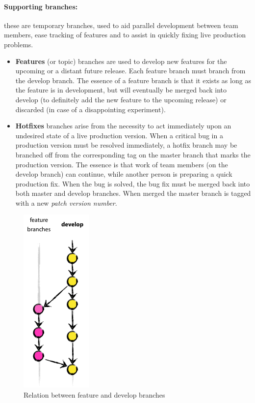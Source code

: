 \documentclass[12pt,a4paper]{article}
\begin{document}
\paragraph{Supporting branches:} these are temporary branches, used to aid parallel development between team members, ease tracking of features and to assist in quickly fixing live production problems.
\begin{itemize}
\item \textbf{Features} (or topic) branches are  used to develop new features for the upcoming or a distant future release. Each feature branch must branch from the develop branch. The essence of a feature branch is that it exists as long as the feature is in development, but will eventually be merged back into develop (to definitely add the new feature to the upcoming release) or discarded (in case of a disappointing experiment).
\item \textbf{Hotfixes} branches arise from the necessity to act immediately upon an undesired state of a live production version. When a critical bug in a production version must be resolved immediately, a hotfix branch may be branched off from the corresponding tag on the master branch that marks the production version. The essence is that work of team members (on the develop branch) can continue, while another person is preparing a quick production fix. When the bug is solved, the bug fix must be merged back into both master and develop branches. When merged the master branch is tagged with a new \textit{patch version number}.
\end{itemize}

\begin{figure}
\center
\includegraphics[scale=0.6]{images/featurebranching.png}
\caption{Relation between feature and develop branches}
\end{figure}
\end{document}

